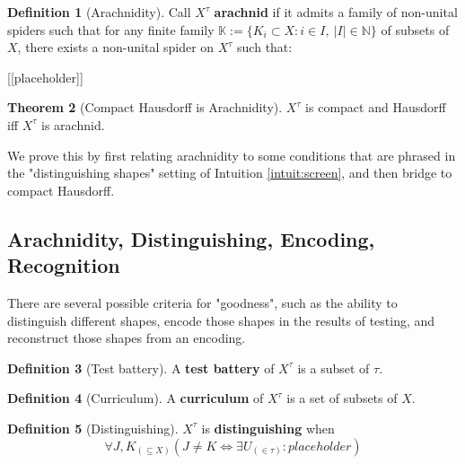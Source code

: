 \documentclass{tufte-handout}
\theoremstyle{definition}
\newtheorem{theorem}{Theorem}[section]
\newtheorem{defn}[theorem]{Definition}
\newtheorem{remark}[theorem]{Remark}
\begin{document}
\begin{defn}[Arachnidity]
Call $X^\tau$ \textbf{arachnid} if it admits a family of non-unital spiders such that for any finite family $\mathbb{K}:=\{K_i \subset X : i \in I, \ |I| \in \mathbb{N}\}$ of subsets of $X$, there exists a non-unital spider on $X^\tau$ such that:

[[placeholder]]

\end{defn}

\begin{theorem}[Compact Hausdorff is Arachnidity]
$X^\tau$ is compact and Hausdorff iff $X^\tau$ is arachnid.
\end{theorem}

We prove this by first relating arachnidity to some conditions that are phrased in the "distinguishing shapes" setting of Intuition \ref{intuit:screen}, and then bridge to compact Hausdorff.

\subsection{Arachnidity, Distinguishing, Encoding, Recognition}

 There are several possible criteria for "goodness", such as the ability to distinguish different shapes, encode those shapes in the results of testing, and reconstruct those shapes from an encoding.

\begin{defn}[Test battery]
A \textbf{test battery} of $X^\tau$ is a subset of $\tau$.
\end{defn}
\begin{defn}[Curriculum]
A \textbf{curriculum} of $X^\tau$ is a set of subsets of $X$.
\end{defn}

\begin{defn}[Distinguishing]\label{def:distinguish}
$X^\tau$ is \textbf{distinguishing} when
\[\forall J,K_{(\subseteq X)} (J \neq K \iff \exists U_{(\in \tau)}: placeholder)\]
\end{defn}
\end{document}
